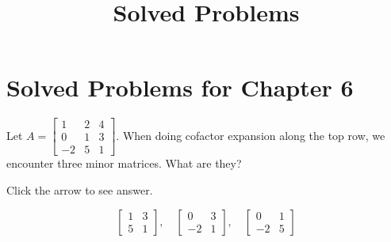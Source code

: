 \documentclass{ximera}
\title{Solved Problems} \license{CC BY-NC-SA 4.0}
\begin{document}
\begin{abstract}
\end{abstract}
\maketitle

\section*{Solved Problems for Chapter 6}

\begin{problem}\label{prb:7.2} Let $A = \left[ \begin{array}{rrr}
1 & 2 & 4 \\
0 & 1 & 3 \\
-2 & 5 & 1
\end{array} \right]$. When doing cofactor expansion along the top row, we encounter three minor matrices.  What are they?

Click the arrow to see answer.
\begin{expandable}
$$\begin{bmatrix}1&3\\5&1\end{bmatrix},\quad\begin{bmatrix}0&3\\-2&1\end{bmatrix},\quad\begin{bmatrix}0&1\\-2&5\end{bmatrix}$$
\end{expandable}
\end{problem}
\end{document}
